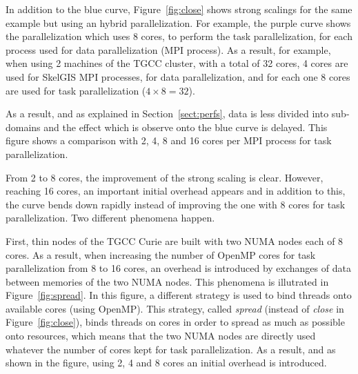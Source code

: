 In addition to the blue curve, Figure~\ref{fig:close} shows strong scalings for the same example but using an hybrid parallelization. For example, the purple curve shows the parallelization which uses 8 cores, to perform the task parallelization, for each process used for data parallelization (\ie MPI process). As a result, for example, when using 2 machines of the TGCC cluster, with a total of 32 cores, 4 cores are used for SkelGIS MPI processes, for data parallelization, and for each one 8 cores are used for task parallelization ($4 \times 8 = 32$).

As a result, and as explained in Section~\ref{sect:perfs}, data is less divided into sub-domains and the effect which is observe onto the blue curve is delayed. This figure shows a comparison with 2, 4, 8 and 16 cores per MPI process for task parallelization.

From 2 to 8 cores, the improvement of the strong scaling is clear. However, reaching 16 cores, an important initial overhead appears and in addition to this, the curve bends down rapidly instead of improving the one with 8 cores for task parallelization. Two different phenomena happen.

First, thin nodes of the TGCC Curie are built with two NUMA nodes each of 8 cores. As a result, when increasing the number of OpenMP cores for task parallelization from 8 to 16 cores, an overhead is introduced by exchanges of data between memories of the two NUMA nodes. This phenomena is illutrated in Figure~\ref{fig:spread}. In this figure, a different strategy is used to bind threads onto available cores (using OpenMP). This strategy, called \emph{spread} (instead of \emph{close} in Figure~\ref{fig:close}), binds threads on cores in order to spread as much as possible onto resources, which means that the two NUMA nodes are directly used whatever the number of cores kept for task parallelization. As a result, and as shown in the figure, using 2, 4 and 8 cores an initial overhead is introduced.

